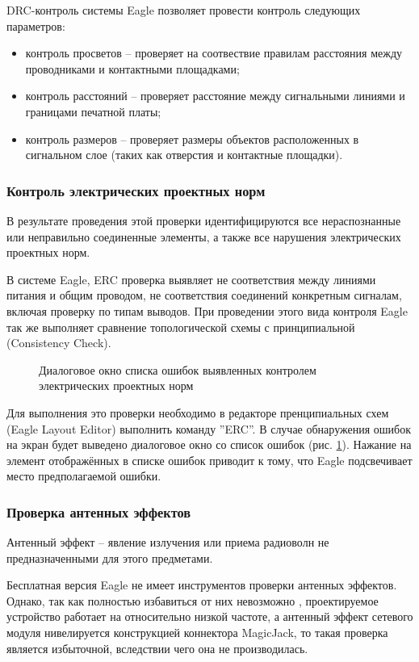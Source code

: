 DRC-контроль системы Eagle позволяет провести контроль следующих параметров:
\begin{itemize}
	\item{} контроль просветов -- проверяет на соотвествие правилам расстояния между
		проводниками и контактными площадками;
	\item{} контроль расстояний -- проверяет расстояние между сигнальными
		линиями и границами печатной платы;
	\item{} контроль размеров -- проверяет размеры объектов расположенных в сигнальном
		слое (таких как отверстия и контактные площадки).
\end{itemize}

\subsubsection{Контроль электрических проектных норм}
В результате проведения этой проверки идентифицируются все нераспознанные или
неправильно соединенные элементы, а также все нарушения электрических проектных норм.

В системе Eagle, ERC проверка выявляет не соответствия между линиями питания и общим проводом,
не соответствия соединений конкретным сигналам, включая проверку по типам выводов.
При проведении этого вида контроля Eagle так же выполняет сравнение топологической схемы
с принципиальной (Consistency Check).

\begin{figure}[h]
	\caption{Диалоговое окно списка ошибок выявленных контролем электрических проектных норм}
	\label{img:erc}
\end{figure}

Для выполнения это проверки необходимо в редакторе пренципиальных схем (Eagle Layout Editor)
выполнить команду ''ERC''. В случае обнаружения ошибок на экран будет выведено диалоговое окно
со список ошибок (рис. \ref{img:erc}). Нажание на элемент отображённых в списке ошибок приводит
к тому, что Eagle подсвечивает место предполагаемой ошибки.


\subsubsection{Проверка антенных эффектов}
Антенный эффект --  явление излучения или приема радиоволн не предназначенными для этого
предметами.

Бесплатная версия Eagle не имеет инструментов проверки антенных эффектов. Однако, так как
полностью избавиться от них невозможно \cite{antennaeff}, проектируемое устройство работает
на относительно низкой частоте, а антенный эффект сетевого модуля нивелируется конструкцией
коннектора MagicJack, то такая проверка является избыточной, вследствии чего
она не производилась.
